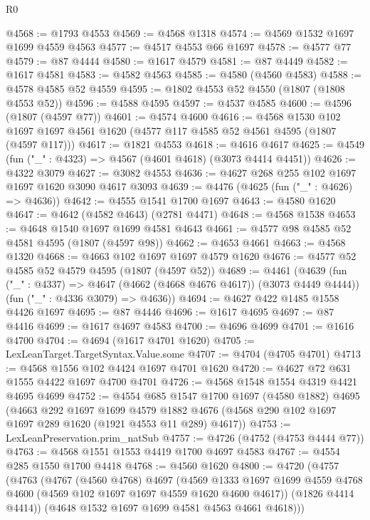 \begin{lexlean}{R0}
\begin{coremodule}
@4568 := @1793 @4553
@4569 := @4568 @1318
@4574 := @4569 @1532 @1697 @1699 @4559 @4563
@4577 := @4517 @4553 @66 @1697
@4578 := @4577 @77
@4579 := @87 @4444
@4580 := @1617 @4579
@4581 := @87 @4449
@4582 := @1617 @4581
@4583 := @4582 @4563
@4585 := @4580 (@4560 @4583)
@4588 := @4578 @4585 @52 @4559
@4595 := @1802 @4553 @52 @4550 (@1807 (@1808 @4553 @52))
@4596 := @4588 @4595
@4597 := @4537 @4585
@4600 := @4596 (@1807 (@4597 @77))
@4601 := @4574 @4600
@4616 := @4568
    @1530
    @102
    @1697
    @1697
    @4561
    @1620
    (@4577 @117 @4585 @52 @4561 @4595 (@1807 (@4597 @117)))
@4617 := @1821 @4553
@4618 := @4616 @4617
@4625 := @4549 (fun ("_" : @4323) => @4567 (@4601 @4618) (@3073 @4414 @4451))
@4626 := @4322 @3079
@4627 := @3082 @4553
@4636 := @4627 @268 @255 @102 @1697 @1697 @1620 @3090 @4617 @3093
@4639 := @4476 (@4625 (fun ("_" : @4626) => @4636))
@4642 := @4555 @1541 @1700 @1697
@4643 := @4580 @1620
@4647 := @4642 (@4582 @4643) (@2781 @4471)
@4648 := @4568 @1538
@4653 := @4648 @1540 @1697 @1699 @4581 @4643
@4661 := @4577 @98 @4585 @52 @4581 @4595 (@1807 (@4597 @98))
@4662 := @4653 @4661
@4663 := @4568 @1320
@4668 := @4663 @102 @1697 @1697 @4579 @1620
@4676 := @4577 @52 @4585 @52 @4579 @4595 (@1807 (@4597 @52))
@4689 := @4461
    (@4639
      (fun ("_" : @4337) => @4647 (@4662 (@4668 @4676 @4617)) (@3073 @4449 @4444))
      (fun ("_" : @4336 @3079) => @4636))
@4694 := @4627 @422 @1485 @1558 @4426 @1697
@4695 := @87 @4446
@4696 := @1617 @4695
@4697 := @87 @4416
@4699 := @1617 @4697 @4583
@4700 := @4696 @4699
@4701 := @1616 @4700
@4704 := @4694 (@1617 @4701 @1620)
@4705 := LexLeanTarget.TargetSyntax.Value.some
@4707 := @4704 (@4705 @4701)
@4713 := @4568 @1556 @102 @4424 @1697 @4701 @1620
@4720 := @4627 @72 @631 @1555 @4422 @1697 @4700 @4701
@4726 := @4568 @1548 @1554 @4319 @4421 @4695 @4699
@4752 := @4554
    @685
    @1547
    @1700
    @1697
    (@4580 @1882)
    @4695
    (@4663
      @292
      @1697
      @1699
      @4579
      @1882
      @4676
      (@4568 @290 @102 @1697 @1697 @289 @1620 (@1921 @4553 @11 @289) @4617))
@4753 := LexLeanPreservation.prim_natSub
@4757 := @4726 (@4752 (@4753 @4444 @77))
@4763 := @4568 @1551 @1553 @4419 @1700 @4697 @4583
@4767 := @4554 @285 @1550 @1700 @4418
@4768 := @4560 @1620
@4800 := @4720
    (@4757
      (@4763
        (@4767
          (@4560 @4768)
          @4697
          (@4569
            @1333
            @1697
            @1699
            @4559
            @4768
            @4600
            (@4569 @102 @1697 @1697 @4559 @1620 @4600 @4617))
          (@1826 @4414 @4414))
        (@4648 @1532 @1697 @1699 @4581 @4563 @4661 @4618)))

\end{coremodule}
\end{lexlean}
